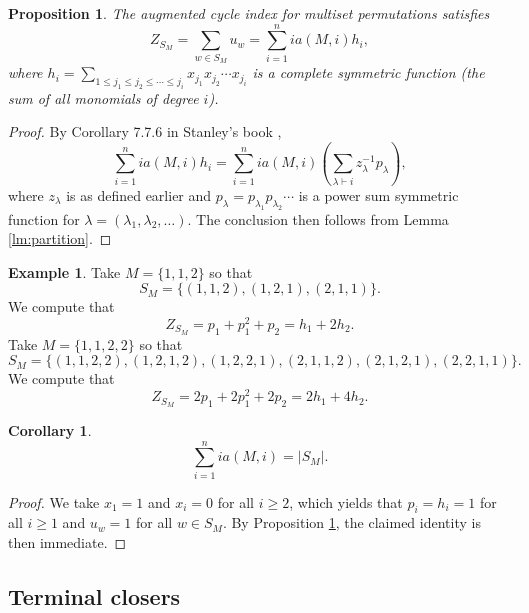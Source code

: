 \documentclass[letterpaper]{amsart}
\theoremstyle{plain}
\newtheorem{proposition}[theorem]{Proposition}
\newtheorem{corollary}[theorem]{Corollary}
\theoremstyle{definition}
\newtheorem{example}[theorem]{Example}
\theoremstyle{remark}
\begin{document}
\begin{proposition}\label{pr:partition}
The augmented cycle index for multiset permutations satisfies
\[Z_{S_M}=\sum_{w \in S_M} u_w=\sum_{i=1}^n i a(M,i) h_i,\]
where $h_i=\sum_{1\leq j_1 \leq j_2 \leq \cdots \leq j_i} x_{j_1}x_{j_2}\cdots x_{j_i}$ is a complete symmetric function (the sum of all monomials of degree $i$).
\end{proposition}

\begin{proof}
By Corollary 7.7.6 in Stanley's book \cite{Stanley1999},
\[\sum_{i=1}^n i a(M,i) h_i =\sum_{i=1}^n i a(M,i) \left(\sum_{\lambda \vdash i} z_\lambda^{-1} p_\lambda \right),\]
where $z_\lambda$ is as defined earlier and $p_\lambda=p_{\lambda_1}p_{\lambda_2}\cdots$ is a power sum symmetric function for $\lambda=(\lambda_1, \lambda_2, \dots).$
The conclusion then follows from Lemma \ref{lm:partition}.
\end{proof}

\begin{example}
Take $M=\{1, 1, 2\}$ so that \[S_M=\{(1,1,2), (1,2,1), (2,1,1)\}.\] We compute that
\[Z_{S_M}=p_1+p_1^2+p_2=h_1+2h_2.\]
Take $M=\{1, 1, 2, 2\}$ so that \[S_M=\{(1,1,2,2), (1,2,1,2), (1,2,2,1), (2,1,1,2), (2,1,2,1), (2,2,1,1)\}.\] We compute that
\[Z_{S_M}=2p_1+2p_1^2+2p_2=2h_1+4h_2.\]
\end{example}

\begin{corollary}
\begin{equation*}
\sum_{i=1}^n i a(M,i) = |S_M|.
\end{equation*}
\end{corollary}

\begin{proof}
We take $x_1=1$ and $x_i=0$ for all $i\geq 2$, which yields that $p_i=h_i=1$ for all $i \geq 1$ and $u_w=1$ for all $w \in S_M$. By Proposition \ref{pr:partition}, the claimed identity is then immediate.
\end{proof}

\subsection{Terminal closers}
\label{subsec:tc}
\end{document}
